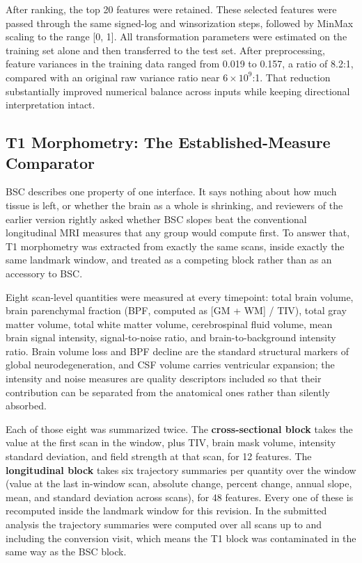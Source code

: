 \documentclass[blue]{ludusofficial}  %
\begin{document}
After ranking, the top 20 features were retained. These selected features were passed through the same signed-log and winsorization steps, followed by MinMax scaling to the range [0, 1]. All transformation parameters were estimated on the training set alone and then transferred to the test set. After preprocessing, feature variances in the training data ranged from 0.019 to 0.157, a ratio of 8.2:1, compared with an original raw variance ratio near $6\times10^{9}$:1. That reduction substantially improved numerical balance across inputs while keeping directional interpretation intact.

\subsection{T1 Morphometry: The Established-Measure Comparator}

BSC describes one property of one interface. It says nothing about how much tissue is left, or whether the brain as a whole is shrinking, and reviewers of the earlier version rightly asked whether BSC slopes beat the conventional longitudinal MRI measures that any group would compute first. To answer that, T1 morphometry was extracted from exactly the same scans, inside exactly the same landmark window, and treated as a competing block rather than as an accessory to BSC.

Eight scan-level quantities were measured at every timepoint: total brain volume, brain parenchymal fraction (BPF, computed as [GM + WM] / TIV), total gray matter volume, total white matter volume, cerebrospinal fluid volume, mean brain signal intensity, signal-to-noise ratio, and brain-to-background intensity ratio. Brain volume loss and BPF decline are the standard structural markers of global neurodegeneration, and CSF volume carries ventricular expansion; the intensity and noise measures are quality descriptors included so that their contribution can be separated from the anatomical ones rather than silently absorbed.

Each of those eight was summarized twice. The \textbf{cross-sectional block} takes the value at the first scan in the window, plus TIV, brain mask volume, intensity standard deviation, and field strength at that scan, for 12 features. The \textbf{longitudinal block} takes six trajectory summaries per quantity over the window (value at the last in-window scan, absolute change, percent change, annual slope, mean, and standard deviation across scans), for 48 features. Every one of these is recomputed inside the landmark window for this revision. In the submitted analysis the trajectory summaries were computed over all scans up to and including the conversion visit, which means the T1 block was contaminated in the same way as the BSC block.
\end{document}
